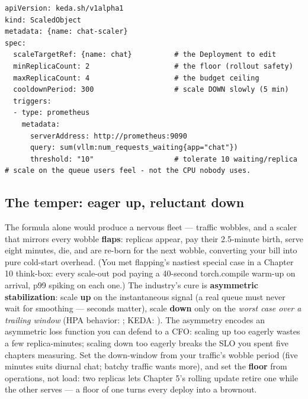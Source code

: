 \begin{terminalbox}
\begin{Verbatim}[breaklines=true,breakanywhere=true,fontsize=\small,formatcom=\color{tbbtermfg},codes=\tbbcodeactive]
apiVersion: keda.sh/v1alpha1
kind: ScaledObject
metadata: {name: chat-scaler}
spec:
  scaleTargetRef: {name: chat}          # the Deployment to edit
  minReplicaCount: 2                    # the floor (rollout safety)
  maxReplicaCount: 4                    # the budget ceiling
  cooldownPeriod: 300                   # scale DOWN slowly (5 min)
  triggers:
  - type: prometheus
    metadata:
      serverAddress: http://prometheus:9090
      query: sum(vllm:num_requests_waiting{app="chat"})
      threshold: "10"                   # tolerate 10 waiting/replica
# scale on the queue users feel - not the CPU nobody uses.
\end{Verbatim}
\end{terminalbox}

\subsection*{The temper: eager up, reluctant down}

The formula alone would produce a nervous fleet — traffic wobbles, and a scaler that mirrors every wobble \textbf{flaps}: replicas appear, pay their 2.5-minute birth, serve eight minutes, die, and are re-born for the next wobble, converting your bill into pure cold-start overhead. (You met flapping's nastiest special case in a Chapter 10 think-box: every scale-out pod paying a 40-second torch.compile warm-up on arrival, p99 spiking on each one.) The industry's cure is \textbf{asymmetric stabilization}: scale \textbf{up} on the instantaneous signal (a real queue must never wait for smoothing — seconds matter), scale \textbf{down} only on the \textit{worst case over a trailing window} (HPA behavior: ; KEDA: ). The asymmetry encodes an asymmetric loss function you can defend to a CFO: scaling up too eagerly wastes a few replica-minutes; scaling down too eagerly breaks the SLO you spent five chapters measuring. Set the down-window from your traffic's wobble period (five minutes suits diurnal chat; batchy traffic wants more), and set the \textbf{floor} from operations, not load: two replicas lets Chapter 5's rolling update retire one while the other serves — a floor of one turns every deploy into a brownout.

